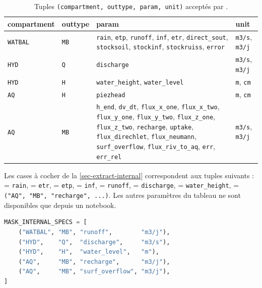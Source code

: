 \begin{table}[H]
    \centering
    \footnotesize
    \begin{tabular}{>{\raggedright}p{1.7cm}>{\raggedright}p{1.3cm}>{\raggedright}p{7.6cm}>{\raggedright\arraybackslash}p{2.6cm}}
        \hline
        \textbf{compartment} & \textbf{outtype} & \textbf{param} & \textbf{unit} \\
        \hline
        \texttt{WATBAL} & \texttt{MB} & \texttt{rain}, \texttt{etp}, \texttt{runoff}, \texttt{inf}, \texttt{etr}, \texttt{direct\_sout}, \texttt{stocksoil}, \texttt{stockinf}, \texttt{stockruiss}, \texttt{error} & \texttt{m3/s}, \texttt{m3/j} \\
        \texttt{HYD} & \texttt{Q} & \texttt{discharge} & \texttt{m3/s}, \texttt{m3/j} \\
        \texttt{HYD} & \texttt{H} & \texttt{water\_height}, \texttt{water\_level} & \texttt{m}, \texttt{cm} \\
        \texttt{AQ} & \texttt{H} & \texttt{piezhead} & \texttt{m}, \texttt{cm} \\
        \texttt{AQ} & \texttt{MB} & \texttt{h\_end}, \texttt{dv\_dt}, \texttt{flux\_x\_one}, \texttt{flux\_x\_two}, \texttt{flux\_y\_one}, \texttt{flux\_y\_two}, \texttt{flux\_z\_one}, \texttt{flux\_z\_two}, \texttt{recharge}, \texttt{uptake}, \texttt{flux\_direchlet}, \texttt{flux\_neumann}, \texttt{surf\_overflow}, \texttt{flux\_riv\_to\_aq}, \texttt{err}, \texttt{err\_rel} & \texttt{m3/s}, \texttt{m3/j} \\
        \hline
    \end{tabular}
    \caption{Tuples \texttt{(compartment, outtype, param, unit)} acceptés par .}
    \label{tab-extract-specs}
\end{table}

Les cases à cocher de la \cref{sec-extract-internal} correspondent aux tuples suivants :  = \texttt{rain},  = \texttt{etr},  = \texttt{etp},  = \texttt{inf},  = \texttt{runoff},  = \texttt{discharge},  = \texttt{water\_height},  = \texttt{("AQ", "MB", "recharge", ...)}. Les autres paramètres du tableau ne sont disponibles que depuis un notebook.

\begin{lstlisting}[language=Python,caption={Exemple de \texttt{specs} pour \script{mask\_internal\_values}.}]
MASK_INTERNAL_SPECS = [
    ("WATBAL", "MB", "runoff",        "m3/j"),
    ("HYD",    "Q",  "discharge",     "m3/s"),
    ("HYD",    "H",  "water_level",   "m"),
    ("AQ",     "MB", "recharge",      "m3/j"),
    ("AQ",     "MB", "surf_overflow", "m3/j"),
]
\end{lstlisting}

